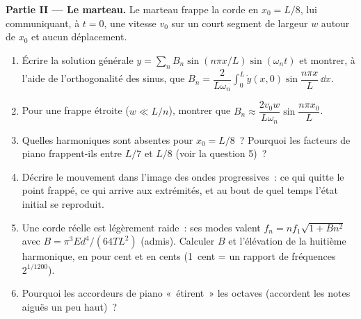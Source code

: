 \begin{problem}
\medskip
\noindent\textbf{Partie II --- Le marteau.}
Le marteau frappe la corde en $x_0 = L/8$, lui communiquant, à $t = 0$, une
vitesse $v_0$ sur un court segment de largeur $w$ autour de $x_0$ et aucun
déplacement.
\begin{enumerate}[resume]
  \item Écrire la solution générale $y = \sum_nB_n\sin(n\pi x/L)\sin(\omega_nt)$
        et montrer, à l'aide de l'orthogonalité des sinus, que $B_n =
        \dfrac{2}{L\omega_n}\int_0^L\dot y(x, 0)\sin\dfrac{n\pi x}L\,\dd x$.
  \item Pour une frappe étroite ($w \ll L/n$), montrer que $B_n \approx \dfrac{2v_0w}
        {L\omega_n}\sin\dfrac{n\pi x_0}{L}$.
  \item Quelles harmoniques sont absentes pour $x_0 = L/8$~? Pourquoi les facteurs
        de piano frappent-ils entre $L/7$ et $L/8$ (voir la question 5)~?
  \item Décrire le mouvement dans l'image des ondes progressives~: ce qui
        quitte le point frappé, ce qui arrive aux extrémités, et au bout de
        quel temps l'état initial se reproduit.
  \item Une corde réelle est légèrement raide~: ses modes valent $f_n = nf_1
        \sqrt{1 + Bn^2}$ avec $B = \pi^3Ed^4/(64TL^2)$ (admis). Calculer
        $B$ et l'élévation de la huitième harmonique, en pour cent et
        en cents (\qty{1}{cent} = un rapport de fréquences $2^{1/1200}$).
  \item Pourquoi les accordeurs de piano «~étirent~» les octaves (accordent les notes aiguës
        un peu haut)~?
\end{enumerate}


\end{problem}

